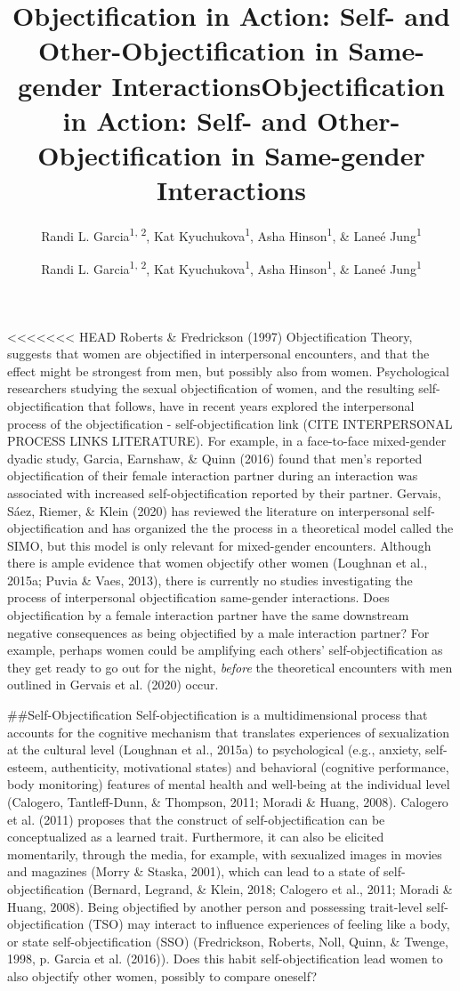 \documentclass[
  man]{apa6}
\title{Objectification in Action: Self- and Other-Objectification in
Same-gender Interactions}
\author{Randi L. Garcia\textsuperscript{1, 2}, Kat
Kyuchukova\textsuperscript{1}, Asha Hinson\textsuperscript{1}, \& Laneé
Jung\textsuperscript{1}}
\date{}
\affiliation{
\vspace{0.5cm}
\textsuperscript{1} Department of Psychology, Smith College\\\textsuperscript{2} Program in Statistical and Data Sciences, Smith College}
\title{Objectification in Action: Self- and Other-Objectification in Same-gender Interactions}
\author{Randi L. Garcia\textsuperscript{1, 2}, Kat Kyuchukova\textsuperscript{1}, Asha Hinson\textsuperscript{1}, \& Laneé Jung\textsuperscript{1}}
\date{}
\begin{document}
\maketitle

<<<<<<< HEAD
Roberts \& Fredrickson (1997) Objectification Theory, suggests that women are objectified in interpersonal encounters, and that the effect might be strongest from men, but possibly also from women. Psychological researchers studying the sexual objectification of women, and the resulting self-objectification that follows, have in recent years explored the interpersonal process of the objectification - self-objectification link (CITE INTERPERSONAL PROCESS LINKS LITERATURE). For example, in a face-to-face mixed-gender dyadic study, Garcia, Earnshaw, \& Quinn (2016) found that men's reported objectification of their female interaction partner during an interaction was associated with increased self-objectification reported by their partner. Gervais, Sáez, Riemer, \& Klein (2020) has reviewed the literature on interpersonal self-objectification and has organized the the process in a theoretical model called the SIMO, but this model is only relevant for mixed-gender encounters. Although there is ample evidence that women objectify other women (Loughnan et al., 2015a; Puvia \& Vaes, 2013), there is currently no studies investigating the process of interpersonal objectification same-gender interactions. Does objectification by a female interaction partner have the same downstream negative consequences as being objectified by a male interaction partner? For example, perhaps women could be amplifying each others' self-objectification as they get ready to go out for the night, \emph{before} the theoretical encounters with men outlined in Gervais et al. (2020) occur.

\#\#Self-Objectification
Self-objectification is a multidimensional process that accounts for the cognitive mechanism that translates experiences of sexualization at the cultural level (Loughnan et al., 2015a) to psychological (e.g., anxiety, self-esteem, authenticity, motivational states) and behavioral (cognitive performance, body monitoring) features of mental health and well-being at the individual level (Calogero, Tantleff-Dunn, \& Thompson, 2011; Moradi \& Huang, 2008). Calogero et al. (2011) proposes that the construct of self-objectification can be conceptualized as a learned trait. Furthermore, it can also be elicited momentarily, through the media, for example, with sexualized images in movies and magazines (Morry \& Staska, 2001), which can lead to a state of self-objectification (Bernard, Legrand, \& Klein, 2018; Calogero et al., 2011; Moradi \& Huang, 2008). Being objectified by another person and possessing trait-level self-objectification (TSO) may interact to influence experiences of feeling like a body, or state self-objectification (SSO) (Fredrickson, Roberts, Noll, Quinn, \& Twenge, 1998, p. Garcia et al. (2016)). Does this habit self-objectification lead women to also objectify other women, possibly to compare oneself?
\end{document}
